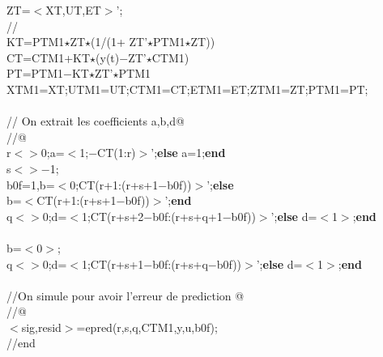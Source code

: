 {\begin{flushleft}
{\cmarg \hspace{0.5cm}ZT=$<$XT,UT,ET$>$';\\ 
\cmarg \hspace{0.5cm}//\\ 
\cmarg \hspace{0.5cm}KT=PTM1$\star$ZT$\star$(1/(1+ ZT'$\star$PTM1$\star$ZT))\\ 
\cmarg \hspace{0.5cm}CT=CTM1+KT$\star$(y(t)$-$ZT'$\star$CTM1)\\ 
\cmarg \hspace{0.5cm}PT=PTM1$-$KT$\star$ZT'$\star$PTM1\\ 
\cmarg \hspace{0.5cm}XTM1=XT;UTM1=UT;CTM1=CT;ETM1=ET;ZTM1=ZT;PTM1=PT;\\ 
\\ 
\cmarg \verb@// On extrait les coefficients a,b,d@\\ 
\cmarg \verb@//@\\ 
 r$<$$>$0;a=$<$1;$-$CT(1:r)$>$';{\bf else} a=1;{\bf end}\\ 
 s$<$$>$$-$1;\\ 
\cmarg \hspace{1.2cm}{\bf if} b0f=1,b=$<$0;CT(r+1:(r+s+1$-$b0f))$>$';{\bf else} \\ 
\cmarg \hspace{3.5cm}b=$<$CT(r+1:(r+s+1$-$b0f))$>$';{\bf end} \\ 
\cmarg \hspace{1.2cm}{\bf if} q$<$$>$0;d=$<$1;CT(r+s+2$-$b0f:(r+s+q+1$-$b0f))$>$';{\bf else} d=$<$1$>$;{\bf end}\\ 
 \\ 
\cmarg \hspace{1.2cm}b=$<$0$>$;\\ 
\cmarg \hspace{1.2cm}{\bf if} q$<$$>$0;d=$<$1;CT(r+s+1$-$b0f:(r+s+q$-$b0f))$>$';{\bf else} d=$<$1$>$;{\bf end}\\ 
\\ 
\cmarg \verb@//On simule pour avoir l'erreur de prediction @\\ 
\cmarg \verb@//@\\ 
\cmarg $<$sig,resid$>$=epred(r,s,q,CTM1,y,u,b0f);\\ 
\cmarg //end}
\end{flushleft}}



